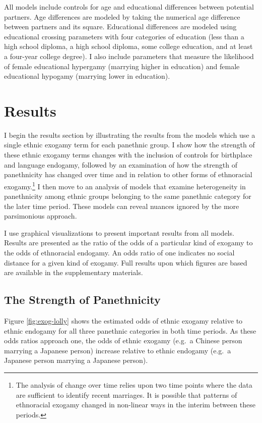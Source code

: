 \documentclass[11pt,]{article}
\begin{document}
All models include controls for age and educational differences between potential partners. Age differences are modeled by taking the numerical age difference between partners and its square. Educational differences are modeled using educational crossing parameters \citep{schwartz_trends_2005} with four categories of education (less than a high school diploma, a high school diploma, some college education, and at least a four-year college degree). I also include parameters that measure the likelihood of female educational hypergamy (marrying higher in education) and female educational hypogamy (marrying lower in education).

\hypertarget{results}{%
\section{Results}\label{results}}

I begin the results section by illustrating the results from the models which use a single ethnic exogamy term for each panethnic group. I show how the strength of these ethnic exogamy terms changes with the inclusion of controls for birthplace and language endogamy, followed by an examination of how the strength of panethnicity has changed over time and in relation to other forms of ethnoracial exogamy.\footnote{The analysis of change over time relies upon two time points where the data are sufficient to identify recent marriages. It is possible that patterns of ethnoracial exogamy changed in non-linear ways in the interim between these periods.} I then move to an analysis of models that examine heterogeneity in panethnicity among ethnic groups belonging to the same panethnic category for the later time period. These models can reveal nuances ignored by the more parsimonious approach.

I use graphical visualizations to present important results from all models. Results are presented as the ratio of the odds of a particular kind of exogamy to the odds of ethnoracial endogamy. An odds ratio of one indicates no social distance for a given kind of exogamy. Full results upon which figures are based are available in the supplementary materials.

\hypertarget{the-strength-of-panethnicity}{%
\subsection{The Strength of Panethnicity}\label{the-strength-of-panethnicity}}

Figure \ref{fig:exog-lolly} shows the estimated odds of ethnic exogamy relative to ethnic endogamy for all three panethnic categories in both time periods. As these odds ratios approach one, the odds of ethnic exogamy (e.g.~a Chinese person marrying a Japanese person) increase relative to ethnic endogamy (e.g.~a Japanese person marrying a Japanese person).
\end{document}
